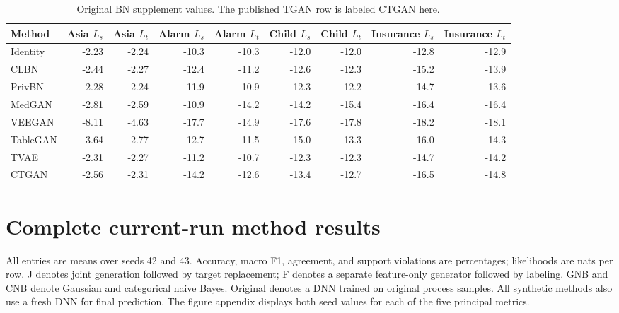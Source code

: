 \documentclass[11pt,letterpaper]{article}
\begin{document}
\begin{table}[H]\centering
\caption{Original BN supplement values. The published TGAN row is labeled CTGAN here.}\label{tab:paperbnfull}
\footnotesize
\begin{tabular}{lrrrrrrrr}\toprule
Method & Asia $L_{s}$ & Asia $L_{t}$ & Alarm $L_{s}$ & Alarm $L_{t}$ & Child $L_{s}$ & Child $L_{t}$ & Insurance $L_{s}$ & Insurance $L_{t}$\\\midrule
Identity & -2.23 & -2.24 & -10.3 & -10.3 & -12.0 & -12.0 & -12.8 & -12.9\\
CLBN & -2.44 & -2.27 & -12.4 & -11.2 & -12.6 & -12.3 & -15.2 & -13.9\\
PrivBN & -2.28 & -2.24 & -11.9 & -10.9 & -12.3 & -12.2 & -14.7 & -13.6\\
MedGAN & -2.81 & -2.59 & -10.9 & -14.2 & -14.2 & -15.4 & -16.4 & -16.4\\
VEEGAN & -8.11 & -4.63 & -17.7 & -14.9 & -17.6 & -17.8 & -18.2 & -18.1\\
TableGAN & -3.64 & -2.77 & -12.7 & -11.5 & -15.0 & -13.3 & -16.0 & -14.3\\
TVAE & -2.31 & -2.27 & -11.2 & -10.7 & -12.3 & -12.3 & -14.7 & -14.2\\
CTGAN & -2.56 & -2.31 & -14.2 & -12.6 & -13.4 & -12.7 & -16.5 & -14.8\\
\bottomrule\end{tabular}
\end{table}

\clearpage
\section{Complete current-run method results}\label{app:results}
All entries are means over seeds 42 and 43. Accuracy, macro F1, agreement, and support violations are percentages; likelihoods are nats per row. J denotes joint generation followed by target replacement; F denotes a separate feature-only generator followed by labeling. GNB and CNB denote Gaussian and categorical naive Bayes. Original denotes a DNN trained on original process samples. All synthetic methods also use a fresh DNN for final prediction. The figure appendix displays both seed values for each of the five principal metrics.
\end{document}
